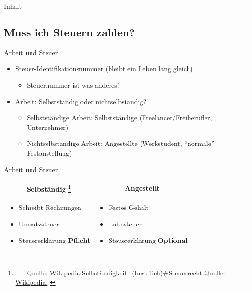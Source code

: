 \documentclass[draft]{beamer}
\let\oldfootnote\footnote
\renewcommand{\footnote}[1]
{%
	\oldfootnote
	{
		\tiny
		\textcolor{gray}{\ #1}
	}%
}
\newcommand{\citewiki}[2][]
{%
	\footnote
	{
		\ifthenelse{\isempty{#1}}
		{
			Quelle: \href{https://de.wikipedia.org/wiki/#2}{Wikipedia:#2}
		}
		{
			Quelle: \href{https://de.wikipedia.org/wiki/#2}{Wikipedia:#1}
		}
	}
}
\begin{document}
		\begin{frame}[t]{Inhalt}
		\end{frame}
	
		\subsection{Muss ich Steuern zahlen?}
		
			\begin{frame}{Arbeit und Steuer}
				\begin{itemize}
					\item Steuer-Identifikationsnummer (bleibt ein Leben lang gleich)
					\begin{itemize}
						\item Steuernummer ist was anderes!
					\end{itemize}
					\item Arbeit: Selbstständig oder nichtselbständig?
					\begin{itemize}
						\item Selbstständige Arbeit: Selbstständige (Freelancer/Freiberufler, Unternehmer)
						\item Nichtselbständige Arbeit: Angestellte (Werkstudent, "`normale"' Festanstellung)
					\end{itemize}
				\end{itemize}
			\end{frame}
		
			\begin{frame}{Arbeit und Steuer}
				\begin{tabularx}{\linewidth}{X|X}
					\multicolumn{1}{c|}{\textbf{Selbständig}\citewiki{Selbständigkeit\_(beruflich)\#Steuerrecht}} &
					\multicolumn{1}{c}{\textbf{Angestellt}} \\[0.25cm]
					\begin{itemize}
						\item Schreibt Rechnungen
						\item Umsatzsteuer
						\item Steuererklärung \textbf{Pflicht}
					\end{itemize} &
					\begin{itemize}
						\item Festes Gehalt
						\item Lohnsteuer
						\item Steuererklärung \textbf{Optional}
					\end{itemize}
				\end{tabularx}
			\end{frame}
		
\end{document}

